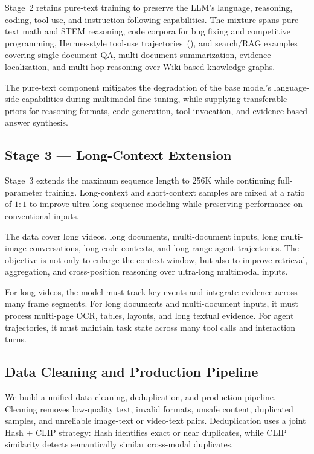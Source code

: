 \documentclass{article} %
\begin{document}
Stage~2 retains pure-text training to preserve the LLM's language, reasoning, coding, tool-use, and instruction-following capabilities. The mixture spans pure-text math and STEM reasoning, code corpora for bug fixing and competitive programming, Hermes-style tool-use trajectories~(\cite{hermes}), and search/RAG examples covering single-document QA, multi-document summarization, evidence localization, and multi-hop reasoning over Wiki-based knowledge graphs.

The pure-text component mitigates the degradation of the base model's language-side capabilities during multimodal fine-tuning, while supplying transferable priors for reasoning formats, code generation, tool invocation, and evidence-based answer synthesis.


\subsection{Stage 3 --- Long-Context Extension}

Stage~3 extends the maximum sequence length to 256K while continuing full-parameter training. Long-context and short-context samples are mixed at a ratio of $1{:}1$ to improve ultra-long sequence modeling while preserving performance on conventional inputs.

The data cover long videos, long documents, multi-document inputs, long multi-image conversations, long code contexts, and long-range agent trajectories. The objective is not only to enlarge the context window, but also to improve retrieval, aggregation, and cross-position reasoning over ultra-long multimodal inputs.

For long videos, the model must track key events and integrate evidence across many frame segments. For long documents and multi-document inputs, it must process multi-page OCR, tables, layouts, and long textual evidence. For agent trajectories, it must maintain task state across many tool calls and interaction turns.

\subsection{Data Cleaning and Production Pipeline}

We build a unified data cleaning, deduplication, and production pipeline. Cleaning removes low-quality text, invalid formats, unsafe content, duplicated samples, and unreliable image-text or video-text pairs. Deduplication uses a joint Hash + CLIP strategy: Hash identifies exact or near duplicates, while CLIP similarity detects semantically similar cross-modal duplicates.
\end{document}
